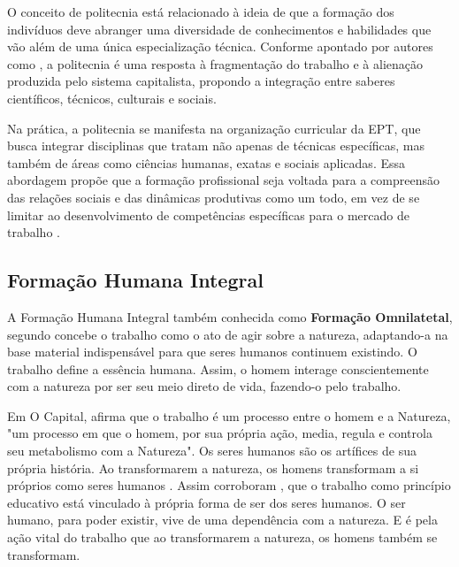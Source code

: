 O conceito de politecnia está relacionado à ideia de que a formação dos indivíduos deve abranger uma diversidade de conhecimentos e habilidades que vão além de uma única especialização técnica. Conforme apontado por autores como , a politecnia é uma resposta à fragmentação do trabalho e à alienação produzida pelo sistema capitalista, propondo a integração entre saberes científicos, técnicos, culturais e sociais.

Na prática, a politecnia se manifesta na organização curricular da EPT, que busca integrar disciplinas que tratam não apenas de técnicas específicas, mas também de áreas como ciências humanas, exatas e sociais aplicadas. Essa abordagem propõe que a formação profissional seja voltada para a compreensão das relações sociais e das dinâmicas produtivas como um todo, em vez de se limitar ao desenvolvimento de competências específicas para o mercado de trabalho \cite{ciavatta2005formaccao}.



\subsection{Formação Humana Integral}

A Formação Humana Integral também conhecida como \textbf{Formação Omnilatetal}, segundo  concebe o trabalho como o ato de agir sobre a natureza, adaptando-a na base material indispensável para que seres humanos continuem existindo. O trabalho define a essência humana. Assim, o homem interage conscientemente com a natureza por ser seu meio direto de vida, fazendo-o pelo trabalho.

Em O Capital,  afirma que o trabalho é um processo entre o homem e a Natureza, "um processo em que o homem, por sua própria ação, media, regula e controla seu metabolismo com a Natureza". Os seres humanos são os artífices de sua própria história. Ao transformarem a natureza, os homens transformam a si próprios como seres humanos \cite{marx1984ideologia}. Assim corroboram , que o trabalho como princípio educativo está vinculado à própria forma de ser dos seres humanos. O ser humano, para poder existir, vive de uma dependência com a natureza. E é pela ação vital do trabalho que ao transformarem a natureza, os homens também se transformam.





